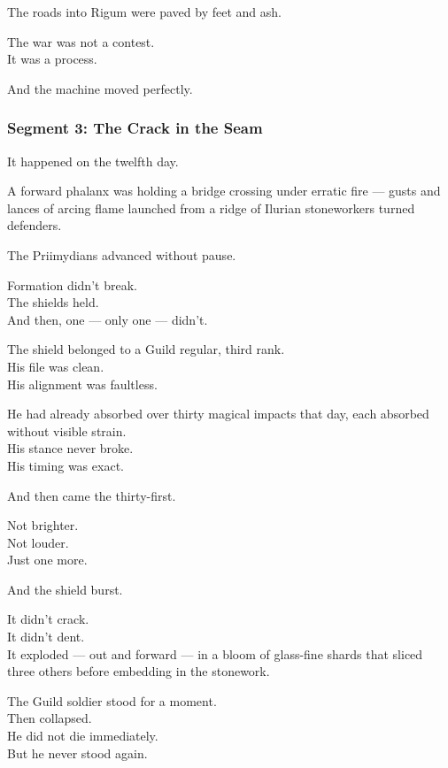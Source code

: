\documentclass[9pt]{article}
\begin{document}
\vspace{1em}

The roads into Rigum were paved by feet and ash.

The war was not a contest.\\
It was a process.

And the machine moved perfectly.

\newpage

\subsubsection*{Segment 3: The Crack in the Seam}

It happened on the twelfth day.

A forward phalanx was holding a bridge crossing under erratic fire — gusts and lances of arcing flame launched from a ridge of Ilurian stoneworkers turned defenders.

The Priimydians advanced without pause.

Formation didn’t break.\\
The shields held.\\
And then, one — only one — didn’t.

\vspace{1em}

The shield belonged to a Guild regular, third rank.\\
His file was clean.\\
His alignment was faultless.

He had already absorbed over thirty magical impacts that day, each absorbed without visible strain.\\
His stance never broke.\\
His timing was exact.

And then came the thirty-first.

Not brighter.\\
Not louder.\\
Just one more.

And the shield burst.

\vspace{1em}

It didn’t crack.\\
It didn’t dent.\\
It exploded — out and forward — in a bloom of glass-fine shards that sliced three others before embedding in the stonework.

The Guild soldier stood for a moment.\\
Then collapsed.\\
He did not die immediately.\\
But he never stood again.
\end{document}
